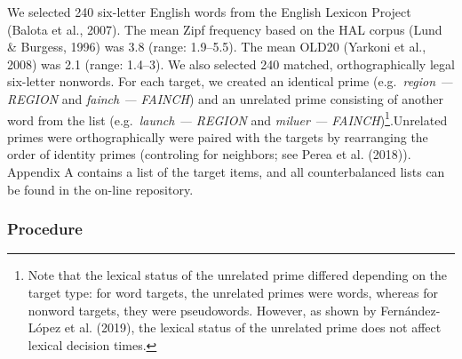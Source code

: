 \documentclass[
  english,
  man,floatsintext]{apa6}
\begin{document}
We selected 240 six-letter English words from the English Lexicon Project (Balota et al., 2007). The mean Zipf frequency based on the HAL corpus (Lund \& Burgess, 1996) was 3.8 (range: 1.9--5.5). The mean OLD20 (Yarkoni et al., 2008) was 2.1 (range: 1.4--3). We also selected 240 matched, orthographically legal six-letter nonwords. For each target, we created an identical prime (e.g.~\emph{region --- REGION} and \emph{fainch --- FAINCH}) and an unrelated prime consisting of another word from the list (e.g.~\emph{launch --- REGION} and \emph{miluer --- FAINCH})\footnote{Note that the lexical status of the unrelated prime differed depending on the target type: for word targets, the unrelated primes were words, whereas for nonword targets, they were pseudowords. However, as shown by Fernández-López et al. (2019), the lexical status of the unrelated prime does not affect lexical decision times.}.Unrelated primes were orthographically were paired with the targets by rearranging the order of identity primes (controling for neighbors; see Perea et al. (2018)). Appendix A contains a list of the target items, and all counterbalanced lists can be found in the on-line repository.

\hypertarget{procedure}{%
\subsubsection{Procedure}\label{procedure}}
\end{document}
